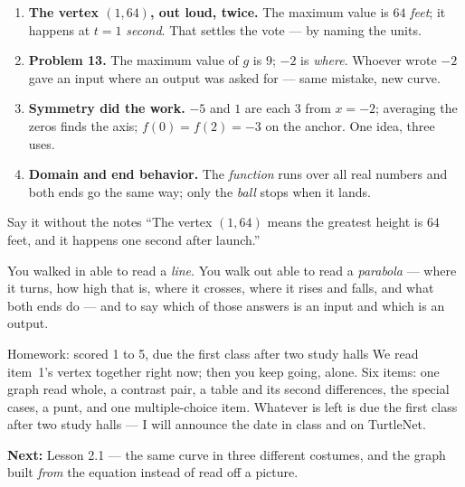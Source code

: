 \documentclass[aspectratio=169, 11pt]{beamer}
\begin{document}
\begin{frame}[t, plain]
  \begin{enumerate}\setlength{\itemsep}{5pt}
    \item \textbf{The vertex $(1,64)$, out loud, twice.} The maximum value is $64$ \emph{feet};
          it happens at $t=1$ \emph{second}. That settles the vote --- by naming the units.
    \item \textbf{Problem 13.} The maximum value of $g$ is $9$; $-2$ is \emph{where}. Whoever
          wrote $-2$ gave an input where an output was asked for --- same mistake, new curve.
    \item \textbf{Symmetry did the work.} $-5$ and $1$ are each $3$ from $x=-2$; averaging the
          zeros finds the axis; $f(0)=f(2)=-3$ on the anchor. One idea, three uses.
    \item \textbf{Domain and end behavior.} The \emph{function} runs over all real numbers and
          both ends go the same way; only the \emph{ball} stops when it lands.
  \end{enumerate}
  \vspace{3pt}
  \begin{block}{Say it without the notes}
    ``The vertex $(1,64)$ means the greatest height is $64$ feet, and it happens one second after
    launch.''
  \end{block}
\end{frame}

\begin{frame}[t, plain]
  You walked in able to read a \emph{line}. You walk out able to read a \emph{parabola} --- where
  it turns, how high that is, where it crosses, where it rises and falls, and what both ends do
  --- and to say which of those answers is an input and which is an output.
  \vspace{5pt}
  \begin{block}{Homework: scored 1 to 5, due the first class after two study halls}
    We read item~1's vertex together right now; then you keep going, alone. Six items: one graph
    read whole, a contrast pair, a table and its second differences, the special cases, a punt,
    and one multiple-choice item. Whatever is left is due the first class after two study halls
    --- I will announce the date in class and on TurtleNet.
  \end{block}
  \vspace{4pt}
  \textbf{Next:} Lesson 2.1 --- the same curve in three different costumes, and the graph built
  \emph{from} the equation instead of read off a picture.
\end{frame}
\end{document}
